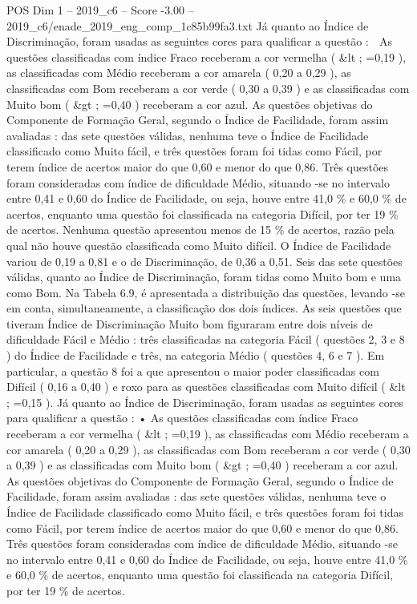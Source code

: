 \begin{textsample}{POS Dim 1 – 2019\_c6 – Score -3.00 – 2019\_c6/enade\_2019\_eng\_comp\_1c85b99fa3.txt}
Já quanto ao Índice de Discriminação, foram usadas as seguintes cores para qualificar a questão :  As questões classificadas com índice Fraco receberam a cor vermelha ( \&lt ; =0,19 ), as classificadas com Médio receberam a cor amarela ( 0,20 a 0,29 ), as classificadas com Bom receberam a cor verde ( 0,30 a 0,39 ) e as classificadas com Muito bom ( \&gt ; =0,40 ) receberam a cor azul.
As questões objetivas do Componente de Formação Geral, segundo o Índice de Facilidade, foram assim avaliadas : das sete questões válidas, nenhuma teve o Índice de Facilidade classificado como Muito fácil, e três questões foram foi tidas como Fácil, por terem índice de acertos maior do que 0,60 e menor do que 0,86.
Três questões foram consideradas com índice de dificuldade Médio, situando -se no intervalo entre 0,41 e 0,60 do Índice de Facilidade, ou seja, houve entre 41,0 \% e 60,0 \% de acertos, enquanto uma questão foi classificada na categoria Difícil, por ter 19 \% de acertos.
Nenhuma questão apresentou menos de 15 \% de acertos, razão pela qual não houve questão classificada como Muito difícil.
O Índice de Facilidade variou de 0,19 a 0,81 e o de Discriminação, de 0,36 a 0,51.
Seis das sete questões válidas, quanto ao Índice de Discriminação, foram tidas como Muito bom e uma como Bom.
Na Tabela 6.9, é apresentada a distribuição das questões, levando -se em conta, simultaneamente, a classificação dos dois índices.
As seis questões que tiveram Índice de Discriminação Muito bom figuraram entre dois níveis de dificuldade Fácil e Médio : três classificadas na categoria Fácil ( questões 2, 3 e 8 ) do Índice de Facilidade e três, na categoria Médio ( questões 4, 6 e 7 ).
Em particular, a questão 8 foi a que apresentou o maior poder classificadas com Difícil ( 0,16 a 0,40 ) e roxo para as questões classificadas com Muito difícil ( \&lt ; =0,15 ).
Já quanto ao Índice de Discriminação, foram usadas as seguintes cores para qualificar a questão : • As questões classificadas com índice Fraco receberam a cor vermelha ( \&lt ; =0,19 ), as classificadas com Médio receberam a cor amarela ( 0,20 a 0,29 ), as classificadas com Bom receberam a cor verde ( 0,30 a 0,39 ) e as classificadas com Muito bom ( \&gt ; =0,40 ) receberam a cor azul.
As questões objetivas do Componente de Formação Geral, segundo o Índice de Facilidade, foram assim avaliadas : das sete questões válidas, nenhuma teve o Índice de Facilidade classificado como Muito fácil, e três questões foram foi tidas como Fácil, por terem índice de acertos maior do que 0,60 e menor do que 0,86.
Três questões foram consideradas com índice de dificuldade Médio, situando -se no intervalo entre 0,41 e 0,60 do Índice de Facilidade, ou seja, houve entre 41,0 \% e 60,0 \% de acertos, enquanto uma questão foi classificada na categoria Difícil, por ter 19 \% de acertos.

\end{textsample}
